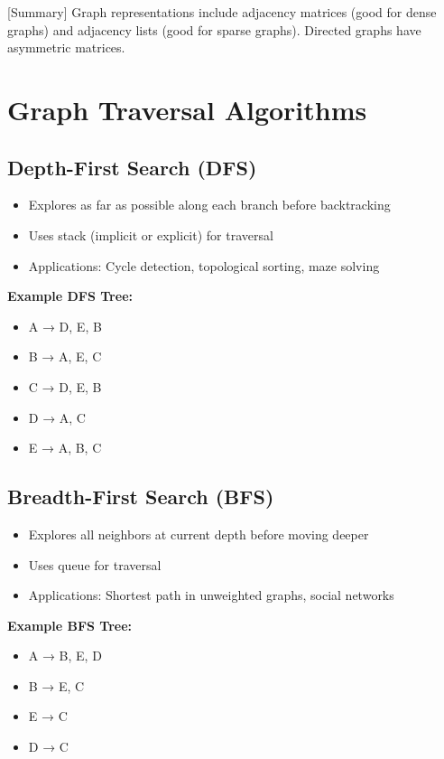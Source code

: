 \documentclass[12pt]{article}
\begin{document}
[Summary] Graph representations include adjacency matrices (good for dense graphs) and adjacency lists (good for sparse graphs). Directed graphs have asymmetric matrices.

\section{Graph Traversal Algorithms}

\subsection{Depth-First Search (DFS)}

\begin{itemize}
    \item Explores as far as possible along each branch before backtracking
    \item Uses stack (implicit or explicit) for traversal
    \item Applications: Cycle detection, topological sorting, maze solving
\end{itemize}

\textbf{Example DFS Tree:}
\begin{itemize}
    \item A → D, E, B
    \item B → A, E, C
    \item C → D, E, B
    \item D → A, C
    \item E → A, B, C
\end{itemize}

\subsection{Breadth-First Search (BFS)}

\begin{itemize}
    \item Explores all neighbors at current depth before moving deeper
    \item Uses queue for traversal
    \item Applications: Shortest path in unweighted graphs, social networks
\end{itemize}

\textbf{Example BFS Tree:}
\begin{itemize}
    \item A → B, E, D
    \item B → E, C
    \item E → C
    \item D → C
\end{itemize}
\end{document}
